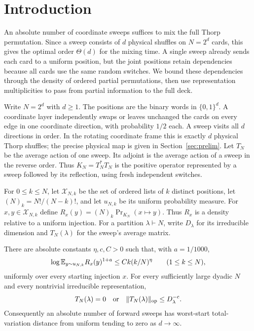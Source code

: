 \section{Introduction}\label{sec:introduction}
An absolute number of coordinate sweeps suffices to mix the full Thorp
permutation. Since a sweep consists of $d$ physical shuffles on $N=2^d$
cards, this gives the optimal order $\Theta(d)$ for the mixing time.
A single sweep already sends each card to a uniform position, but the
joint positions retain dependencies because all cards use the same
random switches. We bound these dependencies through the density of
ordered partial permutations, then use representation multiplicities
to pass from partial information to the full deck.

Write $N=2^d$ with $d\ge1$. The positions are the binary words in $\{0,1\}^d$.
A coordinate layer independently swaps or leaves unchanged the cards on
every edge in one coordinate direction, with probability $1/2$ each.
A sweep visits all $d$ directions in order. In the rotating coordinate
frame this is exactly $d$ physical Thorp shuffles; the precise physical
map is given in Section~\ref{sec:prelim}.
Let $T_N$ be the average action of one sweep. Its adjoint is the average
action of a sweep in the reverse order. Thus $K_N=T_N^*T_N$ is the
positive operator represented by a sweep followed by its reflection,
using fresh independent switches.

For $0\le k\le N$, let $\mathcal X_{N,k}$ be the set of ordered lists of
$k$ distinct positions, let $(N)_k=N!/(N-k)!$, and let $u_{N,k}$ be its
uniform probability measure. For $x,y\in\mathcal X_{N,k}$ define
$R_x(y)=(N)_k\Pr_{K_N}(x\mapsto y)$.
Thus $R_x$ is a density relative to a uniform injection. For a partition
$\lambda\vdash N$, write $D_\lambda$ for its irreducible dimension and
$T_N(\lambda)$ for the sweep's average matrix.

\begin{theorem}\label{fac:main}
There are absolute constants $\eta,c,C>0$ such that, with $a=1/1000$,
\[
 \log\mathbb E_{y\sim u_{N,k}}R_x(y)^{1+a}
 \le Ck(k/N)^\eta
 \qquad(1\le k\le N),
\]
uniformly over every starting injection $x$. For every sufficiently
large dyadic $N$ and every nontrivial irreducible representation,
\[
 T_N(\lambda)=0\quad\hbox{or}\quad
 \|T_N(\lambda)\|_{\mathrm{op}}\le D_\lambda^{-c}.
\]
Consequently an absolute number of forward sweeps has worst-start
total-variation distance from uniform tending to zero as $d\to\infty$.
\end{theorem}

